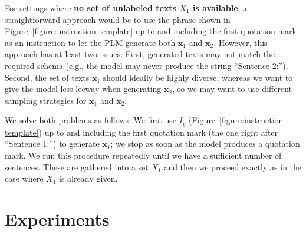 \documentclass[11pt]{article}
\begin{document}
For settings where \textbf{no set of unlabeled texts $X_1$ is
available}, a straightforward approach would be to use the
phrase shown in Figure~\ref{figure:instruction-template} up
to and including the first quotation mark as an instruction
to let the PLM generate both $\mathbf{x}_1$ and
$\mathbf{x}_2$. However, this approach has at least two
issues: First, generated texts may not match the required schema
(e.g., the
model may never produce the string ``Sentence 2:''). Second,
the set of texts $\mathbf{x}_1$ should ideally be highly
diverse, whereas we want to give the model less leeway when
generating $\mathbf{x}_2$, so
we may want to use different sampling strategies for
$\mathbf{x}_1$ and $\mathbf{x}_2$.

We solve both problems as follows: We first use $I_y$
(Figure~\ref{figure:instruction-template}) up to and
including the first quotation mark
(the one right after ``Sentence 1:'')
to generate
$\mathbf{x}_1$; we stop as soon as the model produces a
quotation mark.
We run this procedure repeatedly until we have a sufficient
number of sentences. These are gathered into
a set $X_1$ and then we proceed exactly as in the case where $X_1$
is already given.

\section{Experiments}
\end{document}
